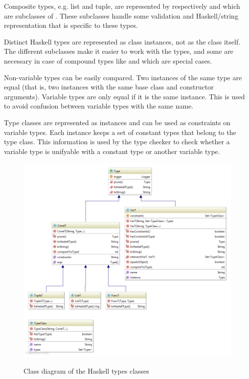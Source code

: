 Composite types, e.g. list and tuple, are represented by respectively  and  which are subclasses of .
These subclasses handle some validation and Haskell/string representation that is specific to these types.

Distinct Haskell types are represented as class instances, not as the class itself. The different  subclasses make it easier to work with the types, and some are necessary in case of compound types like  and  which are special cases.

Non-variable types can be easily compared. Two instances of the same type are equal (that is, two instances with the same base class and constructor arguments).
Variable types are only equal if it is the same instance. This is used to avoid confusion between variable types with the same name.

Type classes are represented as  instances and can be used as constraints on variable types.
Each  instance keeps a set of constant types that belong to the type class.
This information is used by the type checker to check whether a variable type is unifyable with a constant type or another variable type.

\begin{figure}[h]
\centering
\includegraphics[scale=0.4]{Images/classdiagram-type}
\label{fig:classdiagram-type}
\caption{Class diagram of the Haskell types classes}
\end{figure}

